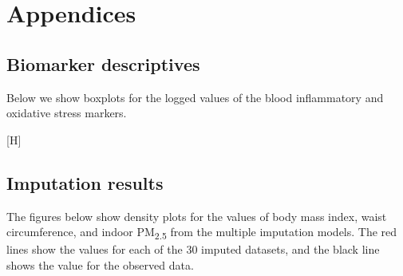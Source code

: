 \documentclass[
  letterpaper,
  DIV=11,
  numbers=noendperiod]{scrartcl}
\makeatletter
\renewenvironment{figure}%
   {\renewcommand\familydefault\sfdefault
    \@float{figure}}
   {\end@float}
\makeatother
\begin{document}
\newpage
\appendix
\renewcommand{\thefigure}{A\arabic{figure}}
\renewcommand{\thetable}{A\arabic{table}}
\setcounter{figure}{0}
\setcounter{table}{0}

\section{Appendices}\label{appendices}

\subsection{Biomarker descriptives}\label{biomarker-descriptives}

Below we show boxplots for the logged values of the blood inflammatory
and oxidative stress markers.

\begin{figure}[H]

\caption{\label{fig-afig-biomarkers}Boxplots for markers of systemic
inflammation including C-reactive protein (CRP), interleukin-6 (IL-6),
tumour necrosis factor alpha (TNF-\(\alpha\)) and markers of oxidative
stress including 8-hydroxy-2'-deoxyguanosine (8-OHdG) and
malondialdehyde (MDA)}


\end{figure}%

\newpage

\subsection{Imputation results}\label{imputation-results}

The figures below show density plots for the values of body mass index,
waist circumference, and indoor PM\textsubscript{2.5} from the multiple
imputation models. The red lines show the values for each of the 30
imputed datasets, and the black line shows the value for the observed
data.
\end{document}

